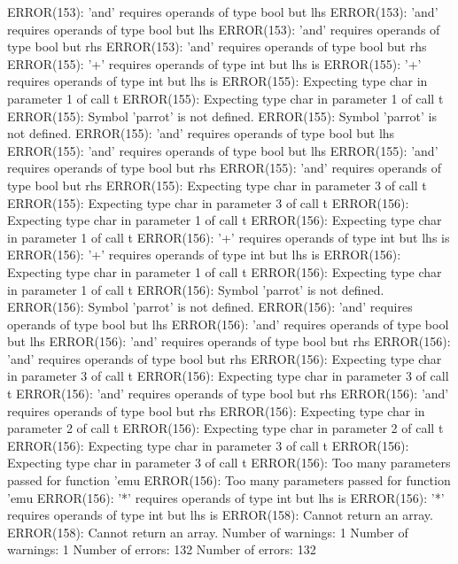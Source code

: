 \documentclass[12pt]{book}
\begin{document}
ERROR(153): 'and' requires operands of type bool but lhs        ERROR(153): 'and' requires operands of type bool but lhs
ERROR(153): 'and' requires operands of type bool but rhs        ERROR(153): 'and' requires operands of type bool but rhs
ERROR(155): '+' requires operands of type int but lhs is        ERROR(155): '+' requires operands of type int but lhs is
ERROR(155): Expecting type char in parameter 1 of call t        ERROR(155): Expecting type char in parameter 1 of call t
ERROR(155): Symbol 'parrot' is not defined.                        ERROR(155): Symbol 'parrot' is not defined.
ERROR(155): 'and' requires operands of type bool but lhs        ERROR(155): 'and' requires operands of type bool but lhs
ERROR(155): 'and' requires operands of type bool but rhs        ERROR(155): 'and' requires operands of type bool but rhs
ERROR(155): Expecting type char in parameter 3 of call t        ERROR(155): Expecting type char in parameter 3 of call t
ERROR(156): Expecting type char in parameter 1 of call t        ERROR(156): Expecting type char in parameter 1 of call t
ERROR(156): '+' requires operands of type int but lhs is        ERROR(156): '+' requires operands of type int but lhs is
ERROR(156): Expecting type char in parameter 1 of call t        ERROR(156): Expecting type char in parameter 1 of call t
ERROR(156): Symbol 'parrot' is not defined.                        ERROR(156): Symbol 'parrot' is not defined.
ERROR(156): 'and' requires operands of type bool but lhs        ERROR(156): 'and' requires operands of type bool but lhs
ERROR(156): 'and' requires operands of type bool but rhs        ERROR(156): 'and' requires operands of type bool but rhs
ERROR(156): Expecting type char in parameter 3 of call t        ERROR(156): Expecting type char in parameter 3 of call t
ERROR(156): 'and' requires operands of type bool but rhs        ERROR(156): 'and' requires operands of type bool but rhs
ERROR(156): Expecting type char in parameter 2 of call t        ERROR(156): Expecting type char in parameter 2 of call t
ERROR(156): Expecting type char in parameter 3 of call t        ERROR(156): Expecting type char in parameter 3 of call t
ERROR(156): Too many parameters passed for function 'emu        ERROR(156): Too many parameters passed for function 'emu
ERROR(156): '*' requires operands of type int but lhs is        ERROR(156): '*' requires operands of type int but lhs is
ERROR(158): Cannot return an array.                                ERROR(158): Cannot return an array.
Number of warnings: 1                                                Number of warnings: 1
Number of errors: 132                                                Number of errors: 132
\end{document}
